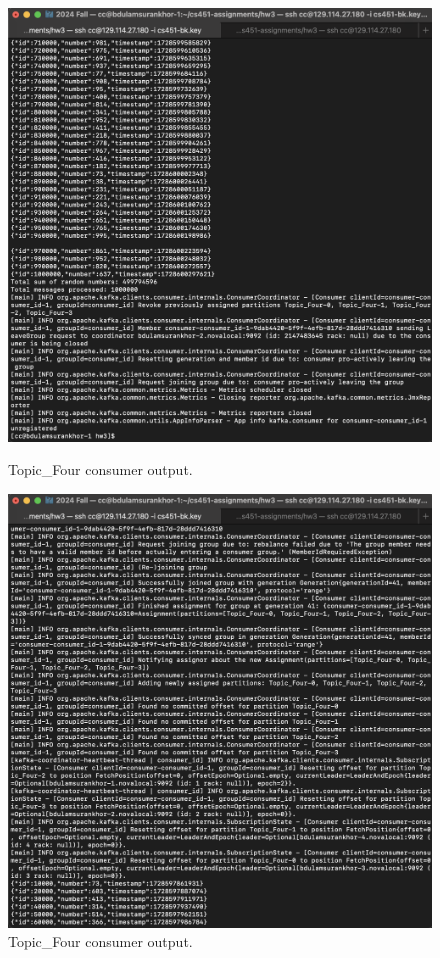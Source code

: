 \documentclass{article}
\begin{document}
\begin{enumerate}
\begin{enumerate}
    \begin{figure}[H]
      \centering
      \begin{minipage}{0.45\textwidth}
        \centering
        \includegraphics[width=1\textwidth]{image17.png}
        \caption{Topic\_Four consumer output.}
      \end{minipage}
      \begin{minipage}{0.45\textwidth}
        \centering
        \includegraphics[width=1\textwidth]{image18.png}
        \caption{Topic\_Four consumer output.}
      \end{minipage}
    \end{figure}


\end{enumerate}
\end{enumerate}
\end{document}
